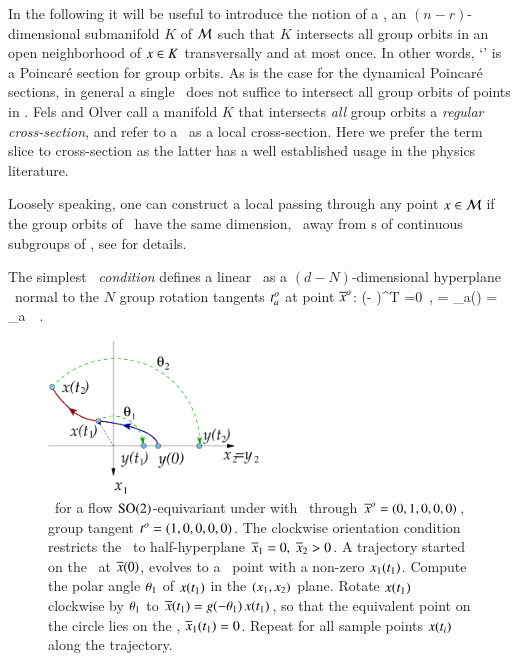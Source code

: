 In the following it will be useful to introduce the
notion of a \emph{\slice}, an $(n-r)$-dimensional submanifold $K$
of ${\cal M}$ such that $K$ intersects all group orbits in an
open neighborhood of $x \in K$ transversally and at most once.
In other words, `\slice' is a Poincar\'e section
for group orbits. As is the case for the dynamical Poincar\'e sections,
in general a single \slice\ does not suffice to intersect all
group orbits of points in \pS. Fels and Olver
call a manifold $K$ that intersects \emph{all} group orbits a
\emph{regular cross-section}, and refer to a \slice\ as a local
cross-section. Here we prefer the term slice
to cross-section as the latter has a well established usage in the physics
literature.

Loosely speaking, one can construct a local {\slice} passing
through any point $x\in {\cal M}$ if the group orbits of \Group\
have the same dimension, \ie\ away from {\fixedsp s}
of continuous subgroups of \Group, see  for
details.

The simplest {\em \slice\ condition} defines a linear \slice\ as a
$(d\!-\!N)$-dim\-ens\-ion\-al hyperplane \pSRed\ normal to
the $N$ group rotation tangents $t^o_{a}$ at point ${\overline{x}^o}$:
\beq
(\sspRed - \slicep )^T  =0
    \,,\qquad
{} = \groupTan_a(\slicep) = \Lg_a \, \slicep
\,.

\begin{figure}
 \begin{center}
  \includegraphics[width=0.5\textwidth]{../figs/ESunrot}
 \end{center}
 \label{fig:ESunrot}
 \caption{\Mframes\ for a flow $\textrm{SO}(2)$-equivariant under
 with \slice\ through ${\overline{x}^o}=(0,1,0,0,0)$,
group tangent $t^o_{}=(1,0,0,0,0)$. The clockwise
orientation condition restricts the \slice\ to half-hyperplane
$\overline{x}_1=0,\;\overline{x}_2>0$. A trajectory started on the
\slice\ at $\overline{x}(0)$, evolves to a \statesp\ point with a
non-zero $x_1(t_1)$. Compute the polar angle ${\bf \theta}_1$
of $x(t_1)$ in the $(x_1,x_2)$ plane. Rotate $x(t_1)$
clockwise by ${\bf \theta}_1$ to $\overline{x}(t_1) =
g(-{\bf \theta}_1)\,x(t_1)$, so that the equivalent point
on the circle lies on the \slice, $\overline{x}_1(t_1) =0$. Repeat
for all sample points $x(t_i)$ along the trajectory.}
\end{figure}


